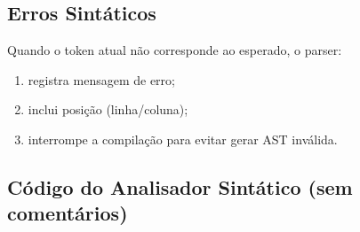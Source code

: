\documentclass[12pt,a4paper]{article}
\begin{document}
\subsection{Erros Sintáticos}
Quando o token atual não corresponde ao esperado, o parser:
\begin{enumerate}[label=\arabic*.]
  \item registra mensagem de erro;
  \item inclui posição (linha/coluna);
  \item interrompe a compilação para evitar gerar AST inválida.
\end{enumerate}

\subsection{Código do Analisador Sintático (sem comentários)}
\end{document}
